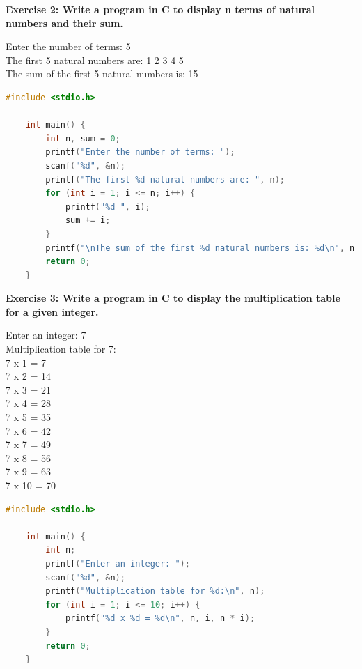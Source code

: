 \documentclass[12pt, openany]{book}
\begin{document}
\clearpage

\noindent\textbf{Exercise 2: Write a program in C to display n terms of natural numbers and their sum.}
\begin{tcolorbox}[colback=lightgray!10, colframe=black, title=Example Output]
    Enter the number of terms: 5 \\
    The first 5 natural numbers are: 1 2 3 4 5 \\
    The sum of the first 5 natural numbers is: 15
\end{tcolorbox}

\begin{lstlisting}[language=C, gobble=0, caption=Solution to Exercise 2]
    #include <stdio.h>
    
    int main() {
        int n, sum = 0;
        printf("Enter the number of terms: ");
        scanf("%d", &n);
        printf("The first %d natural numbers are: ", n);
        for (int i = 1; i <= n; i++) {
            printf("%d ", i);
            sum += i;
        }
        printf("\nThe sum of the first %d natural numbers is: %d\n", n, sum);
        return 0;
    }
\end{lstlisting}

\noindent\textbf{Exercise 3: Write a program in C to display the multiplication table for a given integer.}
\begin{tcolorbox}[colback=lightgray!10, colframe=black, title=Example Output]
    Enter an integer: 7 \\
    Multiplication table for 7: \\
    7 x 1 = 7 \\
    7 x 2 = 14 \\
    7 x 3 = 21 \\
    7 x 4 = 28 \\
    7 x 5 = 35 \\
    7 x 6 = 42 \\
    7 x 7 = 49 \\
    7 x 8 = 56 \\
    7 x 9 = 63 \\
    7 x 10 = 70
\end{tcolorbox}

\begin{lstlisting}[language=C, gobble=0, caption=Solution to Exercise 3]
    #include <stdio.h>
    
    int main() {
        int n;
        printf("Enter an integer: ");
        scanf("%d", &n);
        printf("Multiplication table for %d:\n", n);
        for (int i = 1; i <= 10; i++) {
            printf("%d x %d = %d\n", n, i, n * i);
        }
        return 0;
    }
\end{lstlisting}
\end{document}
